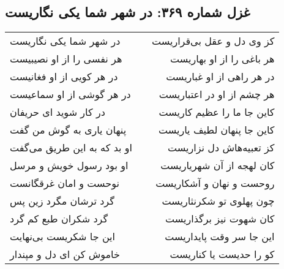 \begin{center}
\section*{غزل شماره ۳۶۹: در شهر شما یکی نگاریست}
\label{sec:0369}
\begin{longtable}{l p{0.5cm} r}
در شهر شما یکی نگاریست
&&
کز وی دل و عقل بی‌قراریست
\\
هر نفسی را از او نصیبیست
&&
هر باغی را از او بهاریست
\\
در هر کویی از او فغانیست
&&
در هر راهی از او غباریست
\\
در هر گوشی از او سماعیست
&&
هر چشم از او در اعتباریست
\\
در کار شوید ای حریفان
&&
کاین جا ما را عظیم کاریست
\\
پنهان یاری به گوش من گفت
&&
کاین جا پنهان لطیف یاریست
\\
او بد که به این طریق می‌گفت
&&
کز تعبیه‌هاش دل نزاریست
\\
او بود رسول خویش و مرسل
&&
کان لهجه از آن شهریاریست
\\
نوحست و امان غرقگانست
&&
روحست و نهان و آشکاریست
\\
گرد ترشان مگرد زین پس
&&
چون پهلوی تو شکرنثاریست
\\
گرد شکران طبع کم گرد
&&
کان شهوت نیز برگذاریست
\\
این جا شکریست بی‌نهایت
&&
این جا سر وقت پایداریست
\\
خاموش کن ای دل و مپندار
&&
کو را حدیست یا کناریست
\\
\end{longtable}
\end{center}
